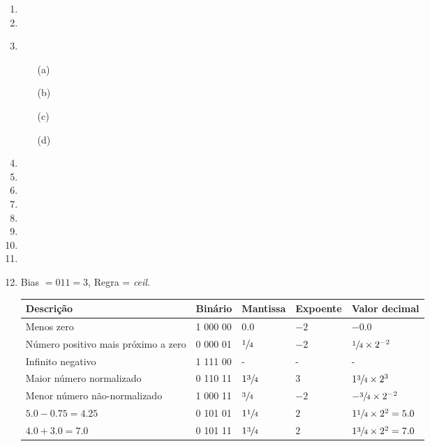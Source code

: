 \begin{enumerate}
    \item

    \item
    
    \item $\!$
    \begin{itemize}
        \item [(a)] 
        \item [(b)] 
        \item [(c)] 
        \item [(d)] 
    \end{itemize}

    \item
    \item
    \item
    \item
    \item
    \item
    \item
    \item

    \item Bias $= 011 = 3$, Regra = {\color{red}\textit{ceil}}. 
    \begin{table}[H]
        \begin{tabular}{|l|l|l|l|l|}
            \hline
            \textbf{Descrição}  &
            \textbf{Binário}    &
            \textbf{Mantissa}   &
            \textbf{Expoente}   &
            \textbf{Valor decimal} \\\hline
            Menos zero 
            & 1 000 00 & $0.0$ & $-2$ & $-0.0$
            \\\hline
            Número positivo mais próximo a zero
            & 0 000 01 & $\sfrac{1}{4}$ & $-2$ & $\sfrac{1}{4}\times 2^{-2}$
            \\\hline
            Infinito negativo
            & 1 111 00 & -  & - & - 
            \\\hline
            Maior número normalizado
            & 0 110 11 & $1\sfrac{3}{4}$ & $3$ & $1\sfrac{3}{4}\times 2^3$
            \\\hline
            Menor número não-normalizado
            & 1 000 11 & $\sfrac{3}{4}$ & $-2$ & $-\sfrac{3}{4}\times 2^{-2}$
            \\\hline\rowcolor{red!25}
            $5.0 - 0.75 = 4.25$
            & 0 101 01 & $1\sfrac{1}{4}$ & $2$ & $1\sfrac{1}{4}\times 2^2 = 5.0$
            \\\hline
            $4.0 + 3.0 = 7.0$
            & 0 101 11 & $1\sfrac{3}{4}$ & $2$ & $1\sfrac{3}{4}\times 2^{2} = 7.0$
            \\\hline
        \end{tabular}
    \end{table}


\end{enumerate}
